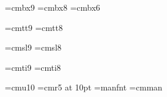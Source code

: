 \font\ninebf=cmbx9
\font\eightbf=cmbx8
\font\sixbf=cmbx6

\font\ninett=cmtt9
\font\eighttt=cmtt8

\hyphenchar{} %
\hyphenchar{}
\hyphenchar{}

\font\ninesl=cmsl9
\font\eightsl=cmsl8

\font\nineit=cmti9
\font\eightit=cmti8

\font\tenu=cmu10 %
\font\magnifiedfiverm=cmr5 at 10pt
\font\manual=manfnt %
\font\cmman=cmman %

\newskip\ttglue
\def\tenpoint{\def\rm{\fam0\tenrm}%
  \textfont0=\tenrm \scriptfont0=\sevenrm \scriptscriptfont0=\fiverm
  \textfont1=\teni \scriptfont1=\seveni \scriptscriptfont1=\fivei
  \textfont2=\tensy \scriptfont2=\sevensy \scriptscriptfont2=\fivesy
  \textfont3=\tenex \scriptfont3=\tenex \scriptscriptfont3=\tenex
  \def\it{\fam\itfam\tenit}%
  \textfont\itfam=\tenit
  \def\sl{\fam\slfam\tensl}%
  \textfont\slfam=\tensl
  \def\bf{\fam\bffam\tenbf}%
  \textfont\bffam=\tenbf \scriptfont\bffam=\sevenbf
   \scriptscriptfont\bffam=\fivebf
  \def\tt{\fam\ttfam\tentt}%
  \textfont\ttfam=\tentt
  \tt \ttglue=.5em plus.25em minus.15em
  \normalbaselineskip=12pt
  \def\MF{{\manual META}\-{\manual FONT}}%
  \let\sc=\eightrm
  \let\big=\tenbig
  \setbox\strutbox=\hbox{\vrule height8.5pt depth3.5pt width\z@}%
  \normalbaselines\rm}

\def\ninepoint{\def\rm{\fam0\ninerm}%
  \textfont0=\ninerm \scriptfont0=\sixrm \scriptscriptfont0=\fiverm
  \textfont1=\ninei \scriptfont1=\sixi \scriptscriptfont1=\fivei
  \textfont2=\ninesy \scriptfont2=\sixsy \scriptscriptfont2=\fivesy
  \textfont3=\tenex \scriptfont3=\tenex \scriptscriptfont3=\tenex
  \def\it{\fam\itfam\nineit}%
  \textfont\itfam=\nineit
  \def\sl{\fam\slfam\ninesl}%
  \textfont\slfam=\ninesl
  \def\bf{\fam\bffam\ninebf}%
  \textfont\bffam=\ninebf \scriptfont\bffam=\sixbf
   \scriptscriptfont\bffam=\fivebf
  \def\tt{\fam\ttfam\ninett}%
  \textfont\ttfam=\ninett
  \tt \ttglue=.5em plus.25em minus.15em
  \normalbaselineskip=11pt
  \def\MF{{\manual hijk}\-{\manual lmnj}}%
  \let\sc=\sevenrm
  \let\big=\ninebig
  \setbox\strutbox=\hbox{\vrule height8pt depth3pt width\z@}%
  \normalbaselines\rm}

\def\ttninepoint{\def\rm{\fam0\ninerm}%
  \textfont0=\ninerm \scriptfont0=\sixrm \scriptscriptfont0=\fiverm
  \textfont1=\ninei \scriptfont1=\sixi \scriptscriptfont1=\fivei
  \textfont2=\ninesy \scriptfont2=\sixsy \scriptscriptfont2=\fivesy
  \textfont3=\tenex \scriptfont3=\tenex \scriptscriptfont3=\tenex
  \def\it{\fam\itfam\nineit}%
  \textfont\itfam=\nineit
  \def\sl{\fam\slfam\ninesl}%
  \textfont\slfam=\ninesl
  \def\bf{\fam\bffam\ninebf}%
  \textfont\bffam=\ninebf \scriptfont\bffam=\sixbf
   \scriptscriptfont\bffam=\fivebf
  \def\tt{\fam\ttfam\ninett}%
  \textfont\ttfam=\ninett
  \normalbaselineskip=11pt
  \normalbaselines\rm}

